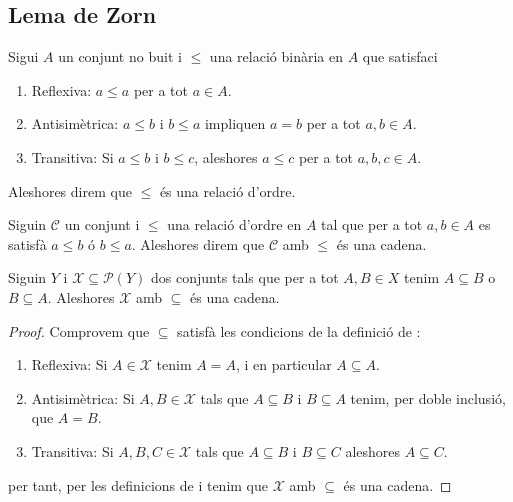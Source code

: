 \documentclass[../../Main.tex]{subfiles}
\begin{document}
	\subsection{Lema de Zorn}
	\begin{definition}
		\label{def:relació d'ordre}
		Sigui \(A\) un conjunt no buit i \(\leq\) una relació binària en \(A\) que satisfaci
		\begin{enumerate}
			\item Reflexiva: \(a\leq a\) per a tot \(a\in A\).
			\item Antisimètrica: \(a\leq b\) i \(b\leq a\) impliquen \(a=b\) per a tot \(a,b\in A\).
			\item Transitiva: Si \(a\leq b\) i \(b\leq c\), aleshores \(a\leq c\) per a tot \(a,b,c\in A\).
		\end{enumerate}
		Aleshores direm que \(\leq\) és una relació d'ordre.
	\end{definition}
	\begin{definition}[Cadena]
		\label{def:cadena}
		Siguin \(\mathcal{C}\) un conjunt i \(\leq\) una relació d'ordre en \(A\) tal que per a tot \(a,b\in A\) es satisfà \(a\leq b\) ó \(b\leq a\). Aleshores direm que \(\mathcal{C}\) amb \(\leq\) és una cadena.
	\end{definition}
	\begin{proposition}
		\label{prop:subconjunts d'un conjunt amb inclusió són una cadena}
		Siguin \(Y\) i \(\mathcal{X}\subseteq\mathcal{P}(Y)\) dos conjunts tals que per a tot \(A,B\in X\) tenim \(A\subseteq B\) o \(B\subseteq A\). Aleshores \(\mathcal{X}\) amb \(\subseteq\) és una cadena.
		\begin{proof}
			Comprovem  que \(\subseteq\) satisfà les condicions de la definició de :
			\begin{enumerate}
				\item Reflexiva: Si \(A\in\mathcal{X}\) tenim \(A=A\), i en particular \(A\subseteq A\). %
				\item Antisimètrica: Si \(A,B\in\mathcal{X}\) tals que \(A\subseteq B\) i \(B\subseteq A\) tenim, per doble inclusió, que \(A=B\). %
				\item Transitiva: Si \(A,B,C\in\mathcal{X}\) tals que \(A\subseteq B\) i \(B\subseteq C\) aleshores \(A\subseteq C\).
			\end{enumerate}
			per tant, per les definicions de  i  tenim que \(\mathcal{X}\) amb \(\subseteq\) és una cadena.
		\end{proof}
	\end{proposition}
\end{document}
